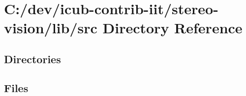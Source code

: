 \section{C\+:/dev/icub-\/contrib-\/iit/stereo-\/vision/lib/src Directory Reference}
\label{dir_a065c5f60305fee3569f887679366939}
\subsection*{Directories}
\begin{DoxyCompactItemize}
\end{DoxyCompactItemize}
\subsection*{Files}
\begin{DoxyCompactItemize}
\end{DoxyCompactItemize}
